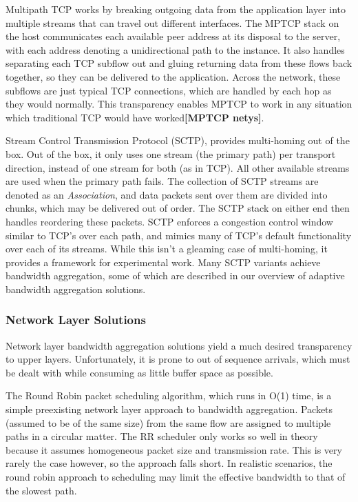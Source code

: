 \documentclass[12pt]{article}
\newcommand{\lcite}[1]
{{\bfseries\color{orange}[#1]}}
\begin{document}
		Multipath TCP works by breaking outgoing data from the application layer into multiple streams that can travel out different interfaces. The MPTCP stack on the host communicates each available peer address at its disposal to the server, with each address denoting a unidirectional path to the instance. It also handles separating each TCP subflow out and gluing returning data from these flows back together, so they can be delivered to the application. Across the network, these subflows are just typical TCP connections, which are handled by each hop as they would normally. This transparency enables MPTCP to work in any situation which traditional TCP would have worked\lcite{MPTCP netys}.

		Stream Control Transmission Protocol (SCTP), provides multi-homing out of the box. Out of the box, it only uses one stream (the primary path) per transport direction, instead of one stream for both (as in TCP). All other available streams are used when the primary path fails. The collection of SCTP streams are denoted as an {\it Association}, and data packets sent over them are divided into chunks, which may be delivered out of order. The SCTP stack on either end then handles reordering these packets. SCTP enforces a congestion control window similar to TCP's over each path, and mimics many of TCP's default functionality over each of its streams\cite{5763587}. While this isn't a gleaming case of multi-homing, it provides a framework for experimental work. Many SCTP variants achieve bandwidth aggregation, some of which are described in our overview of adaptive bandwidth aggregation solutions.

	\subsubsection{Network Layer Solutions}

		Network layer bandwidth aggregation solutions yield a much desired transparency to upper layers. Unfortunately, it is prone to out of sequence arrivals, which must be dealt with while consuming as little buffer space as possible.

		The Round Robin packet scheduling algorithm, which runs in O(1) time, is a simple preexisting network layer approach to bandwidth aggregation. Packets (assumed to be of the same size) from the same flow are assigned to multiple paths in a circular matter. The RR scheduler only works so well in theory because it assumes homogeneous packet size and transmission rate. This is very rarely the case however, so the approach falls short. In realistic scenarios, the round robin approach to scheduling may limit the effective bandwidth to that of the slowest path.%
\end{document}

